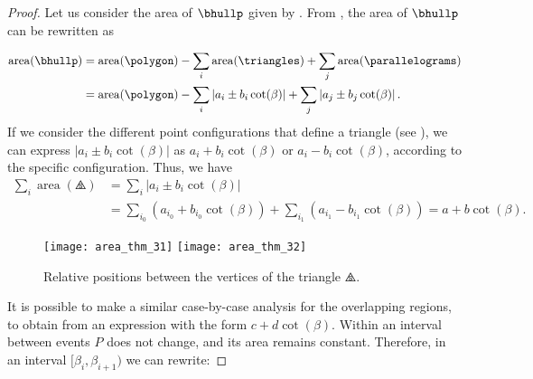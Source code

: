 \documentclass[11pt,letterpaper,english]{article}
\theoremstyle{definition}
\newcommand{\area}{\operatorname{area}}
\begin{document}
\begin{proof}
  Let us consider the area of $\bhullp$ given by
  . From
  , the area
  of $\bhullp$ can be rewritten as

  \begin{align}
    \label{apps:area:eqn:event_1}
    \area(\bhullp) &= \area(\polygon)
                     - \sum_i \area(\triangles)
                     + \sum_j \area(\parallelograms) \nonumber \\
                   &= \area(\polygon)
                     - \sum_i \left| a_i \pm b_i \cot(\beta) \right|
                     + \sum_j \left| a_j \pm b_j \cot(\beta) \right|.
  \end{align}
  If we consider the different point configurations that define a
  triangle (see ), we can express
  $|a_i \pm b_i \cot(\beta)|$ as $a_i + b_i \cot(\beta)$ or
  $a_i - b_i \cot(\beta)$, according to the specific
  configuration. Thus, we have
    \begin{align*}
    \sum_i \area(\triangles) &= \sum_i |a_i \pm b_i\cot(\beta)| \\
                             &= \sum_{i_0} \left( a_{i_0} + b_{i_0}\cot(\beta) \right)
                               + \sum_{i_1} \left( a_{i_1} - b_{i_1}\cot(\beta)\right)= a + b\cot(\beta).
  \end{align*}

  \begin{figure}[ht]
    \centering
    \subcaptionbox{\label{apps:area:fig:events:1}}
    {\texttt{[image: area\_thm\_31]}}
    \hspace{1.5cm}
    \subcaptionbox{\label{apps:area:fig:events:2}}
    {\texttt{[image: area\_thm\_32]}}
    \caption{Relative positions between the vertices of the triangle
      $\triangles$.}
    \label{apps:area:fig:events}
  \end{figure}

  It is possible to make a similar case-by-case analysis for the
  overlapping regions, to obtain from  an
  expression with the form $c + d\cot(\beta)$. Within an interval
  between events $P$ does not change, and its area remains
  constant. Therefore, in an interval $[\beta_i,\beta_{i+1})$ we can rewrite:


\end{proof}
\end{document}
